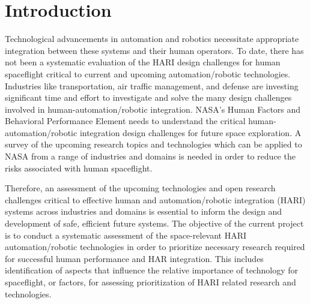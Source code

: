 
\section{Introduction}
Technological advancements in automation and robotics necessitate appropriate integration between these systems and their human operators.
To date, there has not been a systematic evaluation of the HARI design challenges for human spaceflight critical to current and upcoming automation/robotic technologies.
Industries like transportation, air traffic management, and defense are investing significant time and effort to investigate and solve the many design challenges involved in human-automation/robotic integration.
NASA's Human Factors and Behavioral Performance Element needs to understand the critical human-automation/robotic integration design challenges for future space exploration.
A survey of the upcoming research topics and technologies which can be applied to NASA from a range of industries and domains is needed in order to reduce the risks associated with human spaceflight.

Therefore, an assessment of the upcoming technologies and open research challenges critical to effective human and automation/robotic integration (HARI) systems across industries and domains is essential to inform the design and development of safe, efficient future systems.
The objective of the current project is to conduct a systematic assessment of the space-relevant HARI automation/robotic technologies in order to prioritize necessary research required for successful human performance and HAR integration.
This includes identification of aspects that influence the relative importance of technology for spaceflight, or factors, for assessing prioritization of HARI related research and technologies.

